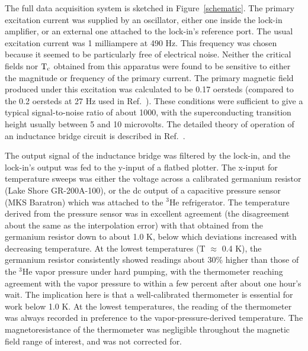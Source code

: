 	The   full    data       acquisition system    is     sketched   in
Figure~\ref{schematic}.  The primary excitation current  was supplied by an
oscillator,   either one inside the lock-in   amplifier, or an external one
attached to the lock-in's reference port.  The usual excitation current was
1 milliampere at 490 Hz. This frequency was chosen because  it seemed to be
particularly   free of electrical noise.   Neither  the critical fields nor
$\rm T_c$ obtained from this apparatus were found to be sensitive to either
the magnitude or frequency  of the  primary current.  The  primary magnetic
field  produced under  this excitation  was calculated  to be 0.17 oersteds
(compared to the 0.2  oersteds at 27 Hz  used in Ref.~\cite{iye82}).  These
conditions were sufficient to give a typical signal-to-noise ratio of about
1000, with the superconducting transition height usually  between  5 and 10
microvolts.   The  detailed theory  of operation of  an   inductance bridge
circuit is described in Ref.~\cite{abel64}.

	The  output signal of  the inductance bridge   was filtered  by the
lock-in,  and the lock-in's  output was  fed to the  y-input  of  a flatbed
plotter.  The x-input for temperature sweeps  was either the voltage across
a calibrated germanium resistor (Lake Shore  GR-200A-100), or the dc output
of  a capacitive pressure sensor (MKS  Baratron) which was  attached to the
$^3$He refrigerator.  The temperature derived  from the pressure sensor was
in   excellent    agreement  (the disagreement  about    the   same as  the
interpolation error) with that obtained from the germanium resistor down to
about 1.0 K, below  which deviations increased with decreasing temperature.
At  the lowest  temperatures (T  $\approx$  0.4 K), the germanium  resistor
consistently showed  readings about 30\%  higher than those of  the  $^3$He
vapor pressure under hard pumping, with the  thermometer reaching agreement
with the vapor pressure  to within a  few percent  after  about  one hour's
wait.  The  implication   here  is that   a well-calibrated thermometer  is
essential for work below 1.0 K.  At the lowest temperatures, the reading of
the thermometer   was    always    recorded   in     preference    to   the
vapor-pressure-derived    temperature.  The    magnetoresistance   of   the
thermometer was negligible throughout the magnetic field range of interest,
and was not corrected for.
	
